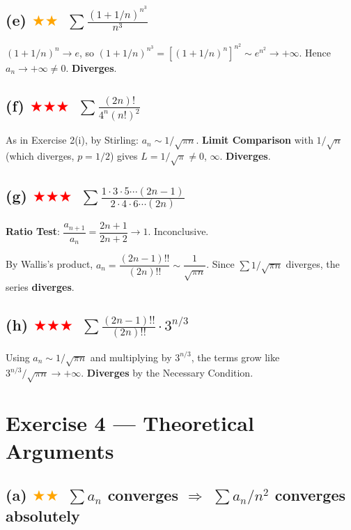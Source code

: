 \documentclass[12pt,a4paper]{article}
\newcommand{\medium}{\textcolor{orange}{$\bigstar\bigstar$}}
\newcommand{\hard}{\textcolor{red}{$\bigstar\bigstar\bigstar$}}
\begin{document}
\subsection*{(e) \medium\ $\displaystyle\sum\frac{(1+1/n)^{n^3}}{n^3}$}

$(1+1/n)^n\to e$, so $(1+1/n)^{n^3}=\left[(1+1/n)^n\right]^{n^2}\sim e^{n^2}\to+\infty$.
Hence $a_n\to+\infty\neq 0$.  \textbf{Diverges}.

\subsection*{(f) \hard\ $\displaystyle\sum\frac{(2n)!}{4^n(n!)^2}$}

As in Exercise 2(i), by Stirling: $a_n\sim 1/\sqrt{\pi n}$.  \textbf{Limit Comparison} with $1/\sqrt{n}$ (which diverges, $p=1/2$) gives $L=1/\sqrt{\pi}\neq 0$, $\infty$.  \textbf{Diverges}.

\subsection*{(g) \hard\ $\displaystyle\sum\frac{1\cdot3\cdot5\cdots(2n-1)}{2\cdot4\cdot6\cdots(2n)}$}

\textbf{Ratio Test}: $\dfrac{a_{n+1}}{a_n}=\dfrac{2n+1}{2n+2}\to 1$.  Inconclusive.

By Wallis's product, $a_n=\dfrac{(2n-1)!!}{(2n)!!}\sim\dfrac{1}{\sqrt{\pi n}}$.  Since $\sum 1/\sqrt{\pi n}$ diverges, the series \textbf{diverges}.

\subsection*{(h) \hard\ $\displaystyle\sum\frac{(2n-1)!!}{(2n)!!}\cdot 3^{n/3}$}

Using $a_n\sim 1/\sqrt{\pi n}$ and multiplying by $3^{n/3}$, the terms grow like $3^{n/3}/\sqrt{\pi n}\to+\infty$.
\textbf{Diverges} by the Necessary Condition.

\section*{Exercise 4 — Theoretical Arguments}

\subsection*{(a) \medium\ $\sum a_n$ converges $\Rightarrow$ $\sum a_n/n^2$ converges absolutely}
\end{document}
